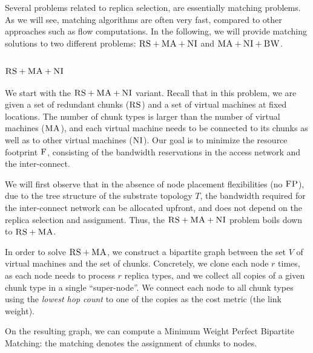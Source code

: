 \documentclass[9pt]{sigcomm-alternate}
\newcommand{\MaFactor}{r}
\newcommand{\ChunkType}{\tau}
\newcommand{\VirtualNodes}{\ensuremath{V}}
\newcommand{\CC}{\textsc{NI}}
\newcommand{\FP}{\textsc{FP}}
\newcommand{\RS}{\textsc{RS}}
\newcommand{\BW}{\textsc{BW}}
\newcommand{\MA}{\textsc{MA}}
\newcommand{\Cost}{\textsc{F}}
\newcommand{\Tree}{\ensuremath{T}}
\begin{document}
Several problems related to replica selection,
are essentially matching problems. As we will see,
matching algorithms are often very fast, compared
to other approaches such as flow computations.
In the following, we will provide matching solutions to
two different problems: $\RS+\MA+\CC$ and $\MA+\CC+\BW$.

\subsubsection{$\RS+\MA+\CC$}

We start with the $\RS+\MA+\CC$ variant.
Recall that in this problem,
we are given a set of redundant chunks ($\RS$) and a set of virtual machines
at fixed locations. The number of chunk types is larger than the number
of virtual machines ($\MA$), and each virtual machine needs to be connected
to its chunks as well as to other virtual machines ($\CC$).
Our goal is to minimize the resource footprint $\Cost$, consisting
of the bandwidth reservations in the access network and the inter-connect.

We will first observe that in the absence of node placement flexibilities (no $\FP$),
due to the tree structure of the substrate topology $\Tree$, the bandwidth required
for the inter-connect network can be allocated upfront, and does not depend on the replica
selection and assignment. Thus, the $\RS+\MA+\CC$ problem boils down to $\RS+\MA$.

In order to solve $\RS+\MA$, we construct a bipartite graph between the set
$\VirtualNodes$ of virtual machines and
the set of chunks.
Concretely, we clone each node $\MaFactor$ times,
as each node needs to process
$\MaFactor$ replica types, and we collect all copies of a given chunk type in a
single %
``super-node''. We connect each node to all chunk types using the
\emph{lowest hop count} to one of the copies as the cost metric (the link weight).

On the resulting graph, we can compute a Minimum Weight
Perfect Bipartite
Matching:
the matching denotes the assignment of chunks to nodes.

\end{document}
